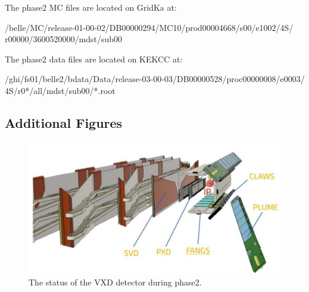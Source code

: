\documentclass[a4paper,11pt,twosided,final,german,openbib,pdftex,listof=totoc,bibliography=totoc]{scrbook}
\begin{document}
\begin{appendix}
The phase2 MC files are located on GridKa at: 
\newline

/belle/MC/release-01-00-02/DB00000294/MC10/prod00004668/s00/e1002/4S/
r00000/3600520000/mdst/sub00
\newline

The phase2 data files are located on KEKCC at:
\newline

/ghi/fs01/belle2/bdata/Data/release-03-00-03/DB00000528/proc00000008/e0003/ 4S/r0*/all/mdst/sub00/*.root
\newline



\subsection{Additional Figures}


\begin{figure}[h!]
	\centering
	\includegraphics[width=\textwidth]{Bilder/VXD_phaseII.png}
	\caption[The Status Of the VXD In Phase2]{The status of the VXD detector during phase2.\cite{phase2vxd}}
	\label{fig:phase2vxd}
\end{figure}




\end{appendix}
\end{document}
